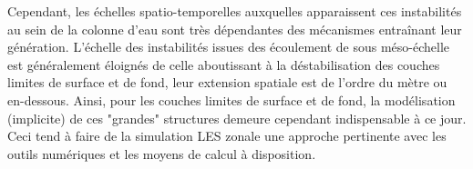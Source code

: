 
Cependant, les échelles spatio-temporelles auxquelles apparaissent ces instabilités au sein de la colonne d'eau sont très dépendantes des mécanismes entraînant leur génération. L'échelle des instabilités issues des écoulement de sous méso-échelle est généralement éloignés de celle aboutissant à la déstabilisation des couches limites de surface et de fond, leur extension spatiale est de l'ordre du mètre ou en-dessous.%
Ainsi, pour les couches limites de surface et de fond, la modélisation (implicite) de ces "grandes" structures demeure cependant indispensable à ce jour. Ceci tend à faire de la simulation LES zonale une approche pertinente avec les outils numériques et les moyens de calcul à disposition.


